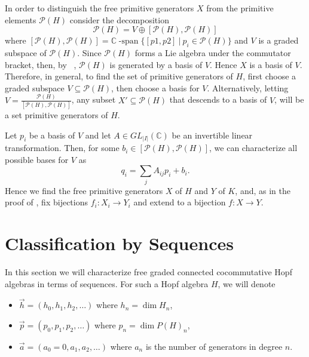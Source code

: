\documentclass[11pt]{amsart}
\theoremstyle{definition}
\numberwithin{equation}{section}
\def\CC{{\mathbb C}}
\begin{document}
In order to distinguish the free primitive generators \(X\)
from the primitive elements \(\mathcal{P}(H)\) consider the decomposition \[
    \mathcal{P}(H) = V \oplus [\mathcal{P}(H), \mathcal{P}(H)]
\] where \([\mathcal{P}(H), \mathcal{P}(H)] = \CC\operatorname{-span}\{[p1,p2] \: \vert \: p_i \in \mathcal{P}(H)\}\) and
\(V\) is a graded subspace of \(\mathcal{P}(H)\). Since \(\mathcal{P}(H)\) forms a Lie algebra under the commutator bracket,
then, by ~\cite[Prop 2.2]{F23}, \(\mathcal{P}(H)\) is generated by a basis of \(V\). Hence \(X\) is a basis of \(V\). Therefore, in general,
to find the set of primitive generators of \(H\), first choose a graded subspace \(V \subseteq \mathcal{P}(H)\), then choose a basis for \(V\).
Alternatively, letting \(V = \frac{\mathcal{P}(H)}{[\mathcal{P}(H), \mathcal{P}(H)]}\),
 any subset \(X' \subseteq \mathcal{P}(H)\) that descends to a basis of \(V\), will be a set primitive generators of \(H\).

Let \(p_i\) be a basis of \(V\) and let  \(A \in GL_{|I|}(\CC)\) be an invertible linear transformation.
Then, for some  \(b_i \in [\mathcal{P}(H), \mathcal{P}(H)]\),
we can characterize all possible bases for \(V\) as \[
    q_i = \sum_jA_{ij}p_i + b_i.
\]
Hence we find the free primitive generators \(X\) of \(H\) and \(Y\) of \(K\), and, as in the proof of
\cite{AT22}, fix bijections \(f_i: X_i  \to Y_i\) and extend to a bijection
\(f:X \to Y\).

\section{Classification by Sequences}

In this section we will characterize free graded connected cocommutative Hopf algebras in terms of sequences. For such a Hopf algebra $H$, we will denote
\begin{itemize} 
    \item $\vec{h} = (h_0, h_1, h_2, \ldots)$ where $h_n = \dim H_n$,
    \item $\vec{p} = (p_0, p_1, p_2, \ldots)$ where $p_n = \dim P(H)_n$,
    \item $\vec{a} = (a_0 = 0, a_1, a_2, \ldots)$ where $a_n$ is the number of generators in degree $n$.
\end{itemize}
\end{document}
